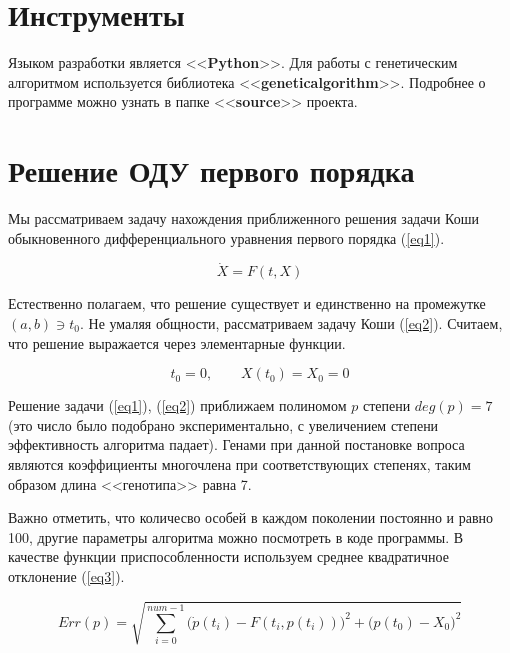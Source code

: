 \documentclass[12pt, a4paper]{article}
\begin{document}
    \section{Инструменты}
    
    Языком разработки является <<\textbf{Python}>>. Для работы с 
    генетическим алгоритмом используется библиотека 
    <<\textbf{geneticalgorithm}>>. Подробнее о программе можно узнать в 
    папке <<\textbf{source}>> проекта.
    
    \section{Решение ОДУ первого порядка}
    
    Мы рассматриваем задачу нахождения приближенного решения задачи Коши 
    обыкновенного дифференциального уравнения первого порядка (\ref{eq1}).
    
    \begin{equation}
        \dot{X} = F(t, X)
        \label{eq1}
    \end{equation}
    
    Естественно полагаем, что решение существует и единственно на промежутке 
    $(a, b) \ni t_{0}$. Не умаляя общности, рассматриваем задачу Коши 
    (\ref{eq2}). Считаем, что решение выражается через элементарные функции.
    
    \begin{equation}
        t_{0} = 0, \qquad X(t_{0}) = X_{0} = 0
        \label{eq2}
    \end{equation}
    
    Решение задачи (\ref{eq1}), (\ref{eq2}) приближаем полиномом $p$ степени 
    $deg(p) = 7$ (это число было подобрано экспериментально, с увеличением 
    степени эффективность алгоритма падает). Генами при данной постановке 
    вопроса являются коэффициенты многочлена при соответствующих степенях, 
    таким образом длина <<генотипа>> равна 7.
    
    Важно отметить, что количесво особей в каждом поколении постоянно и 
    равно 100, другие параметры алгоритма можно посмотреть в коде программы. 
    В качестве функции приспособленности используем среднее квадратичное 
    отклонение (\ref{eq3}).
    
    \begin{equation}
        Err(p) = \sqrt{\sum_{i=0}^{num - 1}\Big(\dot{p}(t_{i}) - F(t_{i}, 
            p(t_{i}))\Big)^{2} + \Big(p(t_{0})-X_{0}\Big)^{2}} 
        \label{eq3}
    \end{equation}
    
\end{document}
